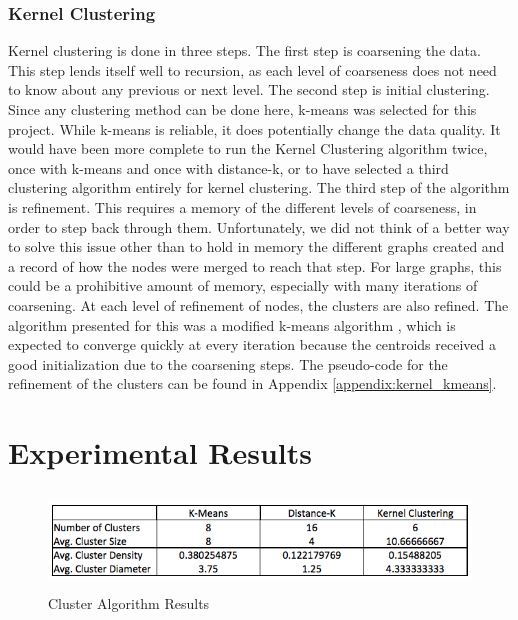 \documentclass[12pt]{article}
\begin{document}
\subsubsection{Kernel Clustering}
Kernel clustering is done in three steps. The first step is coarsening the data. This step lends itself well to recursion, as each level of coarseness does not need to know about any previous or next level. \newline\newline
The second step is initial clustering. Since any clustering method can be done here, k-means was selected for this project. While k-means is reliable, it does potentially change the data quality. It would have been more complete to run the Kernel Clustering algorithm twice, once with k-means and once with distance-k, or to have selected a third clustering algorithm entirely for kernel clustering.
\newline\newline
The third step of the algorithm is refinement. This requires a memory of the different levels of coarseness, in order to step back through them. Unfortunately, we did not think of a better way to solve this issue other than to hold in memory the different graphs created and a record of how the nodes were merged to reach that step. For large graphs, this could be a prohibitive amount of memory, especially with many iterations of coarsening.
\newline\newline
At each level of refinement of nodes, the clusters are also refined. The algorithm presented for this was a modified k-means algorithm \cite{kmeans}, which is expected to converge quickly at every iteration because the centroids received a good initialization due to the coarsening steps. The pseudo-code for the refinement of the clusters can be found in Appendix \ref{appendix:kernel_kmeans}.

\newpage
\section{Experimental Results}

\begin{figure}[!htb]
\begin{center}
	\includegraphics[height=7em]{data.png}
	\caption{Cluster Algorithm Results}
	\label{results_data}
\end{center}
\end{figure}
\end{document}
